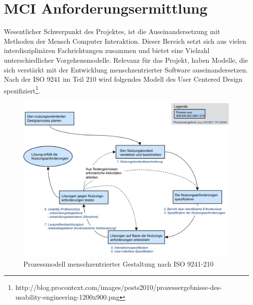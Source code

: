 
\chapter{MCI Anforderungsermittlung}
Wesentlicher Schwerpunkt des Projektes, ist die Auseinandersetzung mit Methoden der Mensch Computer Interaktion. Dieser Bereich  setzt sich aus vielen interdisziplinären Fachrichtungen zusammen und bietet eine Vielzahl unterschiedlicher Vorgehensmodelle. 
Relevanz für das Projekt, haben Modelle, die sich verstärkt mit der Entwicklung menschzentrierter Software auseinandersetzen.
Nach der ISO 9241 im Teil 210 wird folgendes Modell des User Centered Design spezifiziert\footnote{http://blog.procontext.com/images/posts2010/prozessergebnisse-des-usability-engineering-1200x900.png}. 

\begin{figure}[H]
\includegraphics[width=.9\textwidth]{./images/prozessergebnisse.png}
\caption{Prozessmodell menschzentrierter Gestaltung nach ISO 9241-210 }
\label{prozessmodell}
\end{figure}

